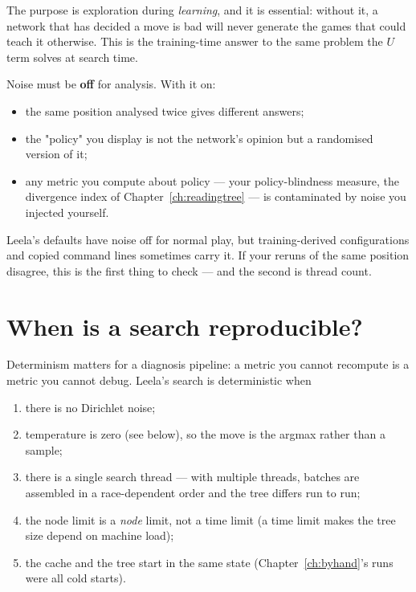 The purpose is exploration during \emph{learning}, and it is essential: without it, a network
that has decided a move is bad will never generate the games that could teach it otherwise.
This is the training-time answer to the same problem the $U$ term solves at search time.

\begin{pitfall}
Noise must be \textbf{off} for analysis. With it on:
\begin{itemize}
\item the same position analysed twice gives different answers;
\item the "policy" you display is not the network's opinion but a randomised version of it;
\item any metric you compute about policy --- your policy-blindness measure, the divergence
  index of Chapter~\ref{ch:readingtree} --- is contaminated by noise you injected yourself.
\end{itemize}
Leela's defaults have noise off for normal play, but training-derived configurations and
copied command lines sometimes carry it. If your reruns of the same position disagree, this
is the first thing to check --- and the second is thread count.
\end{pitfall}

\section{When is a search reproducible?}

Determinism matters for a diagnosis pipeline: a metric you cannot recompute is a metric you
cannot debug. Leela's search is deterministic when

\begin{enumerate}
\item there is no Dirichlet noise;
\item temperature is zero (see below), so the move is the argmax rather than a sample;
\item there is a single search thread --- with multiple threads, batches are assembled in a
  race-dependent order and the tree differs run to run;
\item the node limit is a \emph{node} limit, not a time limit (a time limit makes the tree
  size depend on machine load);
\item the cache and the tree start in the same state (Chapter~\ref{ch:byhand}'s runs were all
  cold starts).
\end{enumerate}

